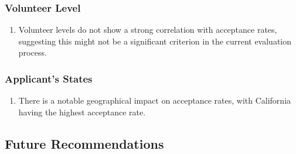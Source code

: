 \documentclass[
  letterpaper,
  DIV=11,
  numbers=noendperiod]{scrartcl}
\providecommand{\tightlist}{%
  \setlength{\itemsep}{0pt}\setlength{\parskip}{0pt}}\usepackage{longtable,booktabs,array}
\begin{document}
\subsubsection{Volunteer Level}\label{volunteer-level}

\begin{enumerate}
\def\labelenumi{\arabic{enumi}.}
\tightlist
\item
  Volunteer levels do not show a strong correlation with acceptance
  rates, suggesting this might not be a significant criterion in the
  current evaluation process.
\end{enumerate}

\subsubsection{Applicant's States}\label{applicants-states}

\begin{enumerate}
\def\labelenumi{\arabic{enumi}.}
\tightlist
\item
  There is a notable geographical impact on acceptance rates, with
  California having the highest acceptance rate.
\end{enumerate}

\subsection{Future Recommendations}\label{future-recommendations}
\end{document}
